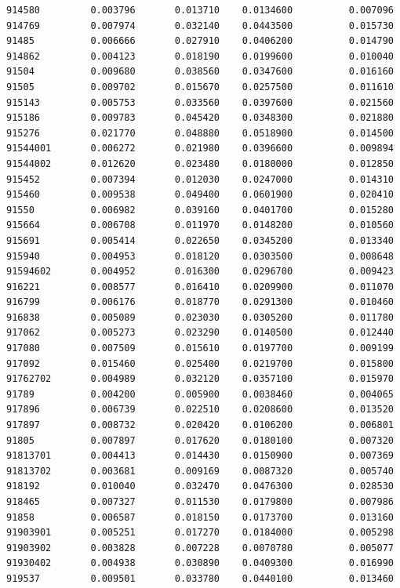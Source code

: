\documentclass[
  letterpaper,
  DIV=11,
  numbers=noendperiod]{scrartcl}
\begin{document}
\begin{verbatim}
914580         0.003796       0.013710    0.0134600          0.007096
914769         0.007974       0.032140    0.0443500          0.015730
91485          0.006666       0.027910    0.0406200          0.014790
914862         0.004123       0.018190    0.0199600          0.010040
91504          0.009680       0.038560    0.0347600          0.016160
91505          0.009702       0.015670    0.0257500          0.011610
915143         0.005753       0.033560    0.0397600          0.021560
915186         0.009783       0.045420    0.0348300          0.021880
915276         0.021770       0.048880    0.0518900          0.014500
91544001       0.006272       0.021980    0.0396600          0.009894
91544002       0.012620       0.023480    0.0180000          0.012850
915452         0.007394       0.012030    0.0247000          0.014310
915460         0.009538       0.049400    0.0601900          0.020410
91550          0.006982       0.039160    0.0401700          0.015280
915664         0.006708       0.011970    0.0148200          0.010560
915691         0.005414       0.022650    0.0345200          0.013340
915940         0.004953       0.018120    0.0303500          0.008648
91594602       0.004952       0.016300    0.0296700          0.009423
916221         0.008577       0.016410    0.0209900          0.011070
916799         0.006176       0.018770    0.0291300          0.010460
916838         0.005089       0.023030    0.0305200          0.011780
917062         0.005273       0.023290    0.0140500          0.012440
917080         0.007509       0.015610    0.0197700          0.009199
917092         0.015460       0.025400    0.0219700          0.015800
91762702       0.004989       0.032120    0.0357100          0.015970
91789          0.004200       0.005900    0.0038460          0.004065
917896         0.006739       0.022510    0.0208600          0.013520
917897         0.008732       0.020420    0.0106200          0.006801
91805          0.007897       0.017620    0.0180100          0.007320
91813701       0.004413       0.014430    0.0150900          0.007369
91813702       0.003681       0.009169    0.0087320          0.005740
918192         0.010040       0.032470    0.0476300          0.028530
918465         0.007327       0.011530    0.0179800          0.007986
91858          0.006587       0.018150    0.0173700          0.013160
91903901       0.005251       0.017270    0.0184000          0.005298
91903902       0.003828       0.007228    0.0070780          0.005077
91930402       0.004938       0.030890    0.0409300          0.016990
919537         0.009501       0.033780    0.0440100          0.013460

\end{verbatim}
\end{document}
